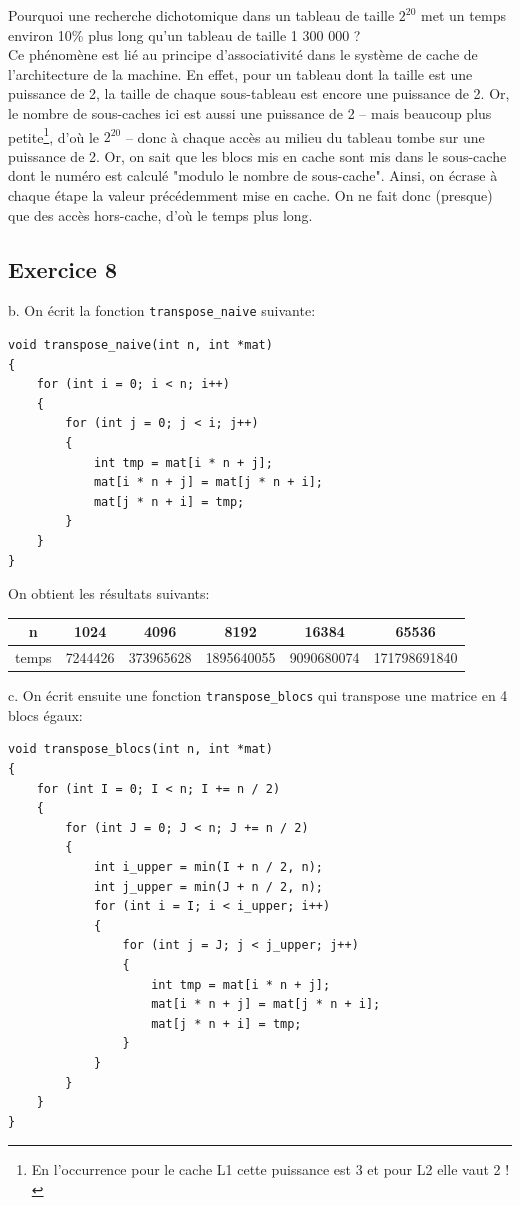 \documentclass[11pt, a4 paper]{article}
\begin{document}
Pourquoi une recherche dichotomique dans un tableau de taille $2^{20}$ met un temps environ 10\% plus long qu'un tableau de taille 1 300 000 ?\\
Ce phénomène est lié au principe d'associativité dans le système de cache de l'architecture de la machine.
En effet, pour un tableau dont la taille est une puissance de 2, la taille de chaque sous-tableau est encore une puissance de 2.
Or, le nombre de sous-caches ici est aussi une puissance de 2 -- mais beaucoup plus petite\footnote{En l'occurrence pour le cache L1 cette puissance est 3 et pour L2 elle vaut 2 !}, d'où le $2^{20}$ -- donc à chaque accès au milieu du tableau tombe sur une puissance de 2.
Or, on sait que les blocs mis en cache sont mis dans le sous-cache dont le numéro est calculé "modulo le nombre de sous-cache".
Ainsi, on écrase à chaque étape la valeur précédemment mise en cache.
On ne fait donc (presque) que des accès hors-cache, d'où le temps plus long.

\subsection{Exercice 8}
b. On écrit la fonction \texttt{transpose\_naive} suivante:
\begin{lstlisting}[style=CStyle]
void transpose_naive(int n, int *mat)
{
    for (int i = 0; i < n; i++)
    {
        for (int j = 0; j < i; j++)
        {
            int tmp = mat[i * n + j];
            mat[i * n + j] = mat[j * n + i];
            mat[j * n + i] = tmp;
        }
    }
}
\end{lstlisting}

On obtient les résultats suivants:
\begin{center}
    \begin{tabular}{| c | c | c | c | c | c |}
        \hline
    n & 1024 & 4096 & 8192 & 16384 & 65536 \\
    \hline
    temps & 7244426 & 373965628 & 1895640055 & 9090680074 & 171798691840\\
    \hline
    \end{tabular}
\end{center}

c. On écrit ensuite une fonction \texttt{transpose\_blocs} qui transpose une matrice en 4 blocs égaux:
\begin{lstlisting}[style=CStyle]
void transpose_blocs(int n, int *mat)
{
    for (int I = 0; I < n; I += n / 2)
    {
        for (int J = 0; J < n; J += n / 2)
        {
            int i_upper = min(I + n / 2, n);
            int j_upper = min(J + n / 2, n);
            for (int i = I; i < i_upper; i++)
            {
                for (int j = J; j < j_upper; j++)
                {
                    int tmp = mat[i * n + j];
                    mat[i * n + j] = mat[j * n + i];
                    mat[j * n + i] = tmp;
                }
            }
        }
    }
}
\end{lstlisting}
\end{document}
